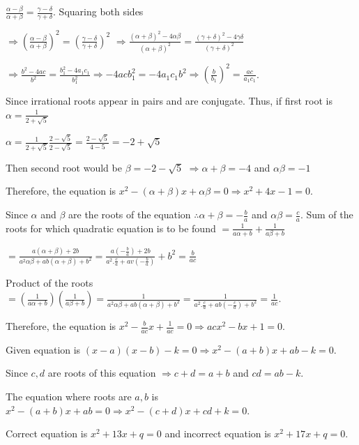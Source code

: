   $\frac{\alpha - \beta}{\alpha + \beta} = \frac{\gamma - \delta}{\gamma + \delta}$. Squaring both sides

  $\Rightarrow \left(\frac{\alpha - \beta}{\alpha + \beta}\right)^2 = \left(\frac{\gamma - \delta}{\gamma +
    \delta}\right)^2$ $\Rightarrow \frac{(\alpha + \beta)^2 - 4\alpha\beta}{(\alpha + \beta)^2} = \frac{(\gamma + \delta)^2 - 4\gamma\delta}{(\gamma +
      \delta)^2}$

  $\Rightarrow \frac{b^2 - 4ac}{b^2} = \frac{b_1^2 - 4a_1c_1}{b_1^2} \Rightarrow -4acb_1^2 = -4a_1c_1b^2 \Rightarrow
  \left(\frac{b}{b_1}\right)^2 = \frac{ac}{a_1c_1}$.
\item Since irrational roots appear in pairs and are conjugate. Thus, if first root is $\alpha = \frac{1}{2 + \sqrt{5}}$

  $\alpha = \frac{1}{2 + \sqrt{5}}\frac{2 - \sqrt{5}}{2 - \sqrt{5}} = \frac{2 - \sqrt{5}}{4 - 5} = -2 + \sqrt{5}$

  Then second root would be $\beta = -2 - \sqrt{5}$ $\Rightarrow \alpha + \beta = -4$ and $\alpha\beta = -1$

  Therefore, the equation is $x^2 - (\alpha + \beta)x + \alpha\beta = 0 \Rightarrow x^2 + 4x -1 = 0$.
\item Since $\alpha$ and $\beta$ are the roots of the equation $\therefore \alpha + \beta = -\frac{b}{a}$ and
  $\alpha\beta = \frac{c}{a}$. Sum of the roots for which quadratic equation is to be found $=
  \frac{1}{a\alpha + b} + \frac{1}{a\beta + b}$

  $= \frac{a(\alpha + \beta) + 2b}{a^2\alpha\beta + ab(\alpha + \beta) + b^2} = \frac{a\left(-\frac{b}{a}\right) +
    2b}{a^2.\frac{c}{a} + av\left(-\frac{b}{a}\right)} + b^2 = \frac{b}{ac}$

  Product of the roots $= \left(\frac{1}{a\alpha + b}\right)\left(\frac{1}{a\beta + b}\right) =
  \frac{1}{a^2\alpha\beta + ab(\alpha + \beta) + b^2} = \frac{1}{a^2.\frac{c}{a} +
    ab\left(-\frac{c}{a}\right) + b^2} = \frac{1}{ac}$.

  Therefore, the equation is $x^2 - \frac{b}{ac}x + \frac{1}{ac} = 0 \Rightarrow acx^2 - bx + 1 = 0$.
\item Given equation is $(x - a)(x - b) - k = 0 \Rightarrow x^2 - (a + b)x + ab - k = 0$.

  Since $c, d$ are roots of this equation $\Rightarrow c + d = a + b$ and $cd = ab - k$.

  The equation where roots are $a, b$ is $x^2 - (a + b)x + ab = 0 \Rightarrow x^2 - (c + d)x + cd + k = 0$.
\item Correct equation is $x^2 + 13x + q = 0$ and incorrect equation is $x^2 + 17x + q = 0$.

